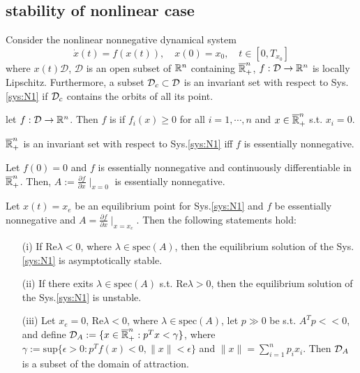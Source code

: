 \documentclass{paper}
\begin{document}
\subsection{stability of nonlinear case}
Consider the nonlinear nonnegative dynamical system
\begin{equation}\label{sys:N1}
\dot{x}(t)=f(x(t)),\quad x(0)=x_0,\quad t\in[0,T_{x_0}]
\end{equation}
where $x(t)\mathcal{D}$, $\mathcal{D}$ is an open subset of $\mathbb{R}^{n}$ containing $\overline{\mathbb{R}}_{+}^{n}$, 
${f}:{\mathcal{D}}\rightarrow{\mathbb{R}^{n}}$ is locally Lipschitz. Furthermore, a subset $\mathcal{D}_{c}\subset \mathcal{D}$ is
an invariant set with respect to Sys.\ref{sys:N1} if $\mathcal{D}_c$ contains the orbits of all its point.
\begin{defi}
let ${f}:{\mathcal{D}}\rightarrow{\mathbb{R}^{n}}$. Then $f$ is  if $f_i(x)\geqslant 0$
for all $i=1,\cdots,n$ and $x\in \overline{\mathbb{R}}_{+}^{n}$ s.t. $x_i=0$.
\end{defi}
\begin{prop}
$\overline{\mathbb{R}}_{+}^{n}$ is an invariant set with respect to Sys.\ref{sys:N1} iff $f$ is essentially nonnegative.
\end{prop}
\begin{lem}
Let $f(0)=0$ and $f$ is essentially nonnegative and continuously differentiable in $\overline{\mathbb{R}}_{+}^{n}$. Then,
$A:=\frac{\partial f}{\partial x}\mid_{x=0}$ is essentially nonnegative.
\end{lem}
\begin{thm}
Let $x(t)=x_e$ be an equilibrium point for Sys.\ref{sys:N1} and $f$ be essentially nonnegative and 
$A=\frac{\partial f}{\partial x}\mid_{x=x_e}$. Then the following statements hold:
\begin{enumerate}
\item[(i)] If Re$\lambda < 0$, where $\lambda\in\text{spec}(A)$, then the equilibrium solution of the 
Sys.\ref{sys:N1} is asymptotically stable.
\item[(ii)] If there exits $\lambda\in\text{spec}(A)$ s.t. Re$\lambda > 0$, then the equilibrium 
solution of the Sys.\ref{sys:N1} is unstable.
\item[(iii)] Let $x_e=0$, Re$\lambda < 0$, where $\lambda\in\text{spec}(A)$, let $p\gg 0$ be s.t.
$A^Tp<<0$, and define $\mathcal{D}_A:=\{x\in\overline{\mathbb{R}}_{+}^{n}:p^Tx<\gamma\}$, where $\gamma:=\text{sup}\{\epsilon>0:
p^Tf(x)<0,\lVert x\rVert<\epsilon\}$ and $\lVert x\rVert=\sum_{i=1}^{n}p_ix_i$. Then $\mathcal{D}_A$ is a
subset of the domain of attraction.
\end{enumerate}
\end{thm}
\end{document}

